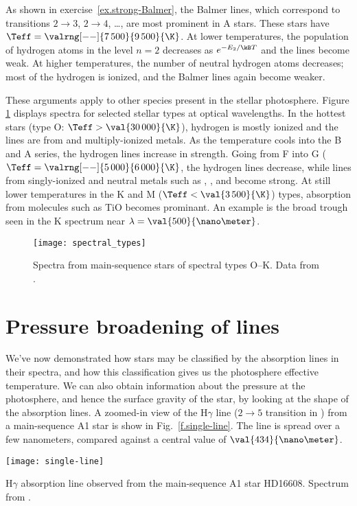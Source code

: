 As shown in exercise~\ref{ex.strong-Balmer}, the Balmer lines, which correspond to transitions $2\to3$, $2\to 4$, \ldots, are most prominent in A stars. These stars have $\Teff = \valrng[--]{7\,500}{9\,500}{\K}$. At lower temperatures, the population of hydrogen atoms in the level $n=2$ decreases as $e^{-E_{2}/\kB T}$ and the lines become weak. At higher temperatures, the number of neutral hydrogen atoms decreases; most of the hydrogen is ionized, and the Balmer lines again become weaker.

These arguments apply to other species present in the stellar photosphere. Figure \ref{f.spectral-types} displays spectra for selected stellar types at optical wavelengths. In the hottest stars (type O: $\Teff > \val{30\,000}{\K}$), hydrogen is mostly ionized and the lines are from  and multiply-ionized metals. As the temperature cools into the B and A series, the hydrogen lines increase in strength. Going from F into G ($\Teff = \valrng[--]{5\,000}{6\,000}{\K}$, the hydrogen lines decrease, while lines from singly-ionized and neutral metals such as , , and  become strong.  At still lower temperatures in the K and M ($\Teff < \val{3\,500}{\K}$) types, absorption from molecules such as TiO becomes prominant.  An example is the broad trough seen in the K spectrum near $\lambda = \val{500}{\nano\meter}$.

\begin{figure}[hbp]
\texttt{[image: spectral\_types]}
\caption[Standard stellar types]{\label{f.spectral-types} Spectra from main-sequence stars of spectral types O--K. Data from \protect\citet{Jacoby1984A-library-of-st}.}
\end{figure}

\section{Pressure broadening of lines}

We've now demonstrated how stars may be classified by the absorption lines in their spectra, and how this classification gives us the photosphere effective temperature. We can also obtain information about the pressure at the photosphere, and hence the surface gravity of the star, by looking at the shape of the absorption lines. A zoomed-in view of the H$\gamma$ line ($2\to5$ transition in ) from a main-sequence A1 star is show in Fig.~\ref{f.single-line}. The line is spread over a few nanometers, compared against a central value of $\val{434}{\nano\meter}$.
\begin{marginfigure}
\texttt{[image: single-line]}
\caption[H$\gamma$ absorption line]{\label{f.single-line} H$\gamma$ absorption line observed from the main-sequence A1 star HD16608. Spectrum from \protect\citet{Jacoby1984A-library-of-st}.}
\end{marginfigure}

